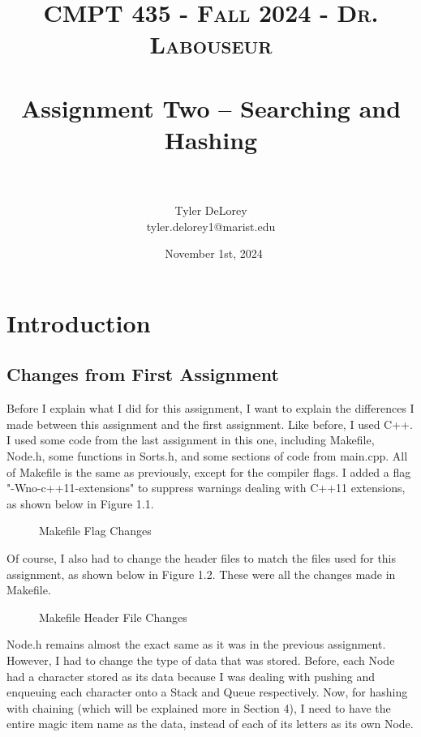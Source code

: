 \documentclass[letterpaper, 10pt]{article}
\title{	
   \normalfont \normalsize 
   \textsc{CMPT 435 - Fall 2024 - Dr. Labouseur} \\[10pt] %
   \horrule{0.5pt} \\[0.25cm] 	%
   \huge Assignment Two -- Searching and Hashing \\     	    %
   \horrule{0.5pt} \\[-0.25cm] 	%
}
\author{Tyler DeLorey \\ \normalsize tyler.delorey1@marist.edu}
\date{\normalsize\ November 1st, 2024}
\begin{document}
 
\maketitle %


\renewcommand{\thefigure}{\thesection.\arabic{figure}}

\vspace{-5em}
\tableofcontents

\section{Introduction}
\subsection{Changes from First Assignment}

\noindent
Before I explain what I did for this assignment, I want to explain the differences I made between this assignment and the first assignment. Like before, I used C++. I used some code from the last assignment in this one, including Makefile, Node.h, some functions in Sorts.h, and some sections of code from main.cpp. All of Makefile is the same as previously, except for the compiler flags. I added a flag "-Wno-c++11-extensions" to suppress warnings dealing with C++11 extensions, as shown below in Figure 1.1.

\begin{figure}[H]
  \centering
  \caption{Makefile Flag Changes}
  \label{fig:figure1.1}
\end{figure}

\noindent
Of course, I also had to change the header files to match the files used for this assignment, as shown below in Figure 1.2. These were all the changes made in Makefile.

\begin{figure}[H]
  \centering
  \caption{Makefile Header File Changes}
  \label{fig:figure1.2}
\end{figure}

\noindent
Node.h remains almost the exact same as it was in the previous assignment. However, I had to change the type of data that was stored. Before, each Node had a character stored as its data because I was dealing with pushing and enqueuing each character onto a Stack and Queue respectively. Now, for hashing with chaining (which will be explained more in Section 4), I need to have the entire magic item name as the data, instead of each of its letters as its own Node.
\end{document}
